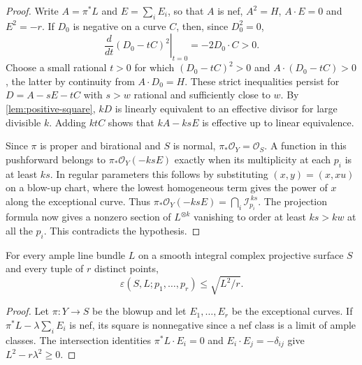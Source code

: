 \begin{proof}
Write $A=\pi^*L$ and $E=\sum_i E_i$, so that $A$ is nef, $A^2=H$, $A\cdot E=0$ and $E^2=-r$. If $D_0$ is negative on a curve $C$, then, since $D_0^2=0$,
\[
 \left.\frac{d}{dt}(D_0-tC)^2\right|_{t=0}=-2D_0\cdot C>0.
\]
Choose a small rational $t>0$ for which $(D_0-tC)^2>0$ and $A\cdot(D_0-tC)>0$, the latter by continuity from $A\cdot D_0=H$. These strict inequalities persist for $D=A-sE-tC$ with $s>w$ rational and sufficiently close to $w$. By \cref{lem:positive-square}, $kD$ is linearly equivalent to an effective divisor for large divisible $k$. Adding $ktC$ shows that $kA-ksE$ is effective up to linear equivalence.

Since $\pi$ is proper and birational and $S$ is normal, $\pi_*\mathcal O_Y=\mathcal O_S$. A function in this pushforward belongs to $\pi_*\mathcal O_Y(-ksE)$ exactly when its multiplicity at each $p_i$ is at least $ks$. In regular parameters this follows by substituting $(x,y)=(x,xu)$ on a blow-up chart, where the lowest homogeneous term gives the power of $x$ along the exceptional curve. Thus $\pi_*\mathcal O_Y(-ksE)=\bigcap_i\mathcal I_{p_i}^{\,ks}$. The projection formula now gives a nonzero section of $L^{\otimes k}$ vanishing to order at least $ks>kw$ at all the $p_i$. This contradicts the hypothesis.
\end{proof}

\begin{lemma}\label{lem:sesha-upper}
For every ample line bundle $L$ on a smooth integral complex projective surface $S$ and every tuple of $r$ distinct points,
\[
 \varepsilon(S,L;p_1,\ldots,p_r)\leq\sqrt{L^2/r}.
\]
\end{lemma}

\begin{proof}
Let $\pi:Y\to S$ be the blowup and let $E_1,\ldots,E_r$ be the exceptional curves. If $\pi^*L-\lambda\sum_i E_i$ is nef, its square is nonnegative since a nef class is a limit of ample classes. The intersection identities $\pi^*L\cdot E_i=0$ and $E_i\cdot E_j=-\delta_{ij}$ give $L^2-r\lambda^2\geq0$.
\end{proof}

